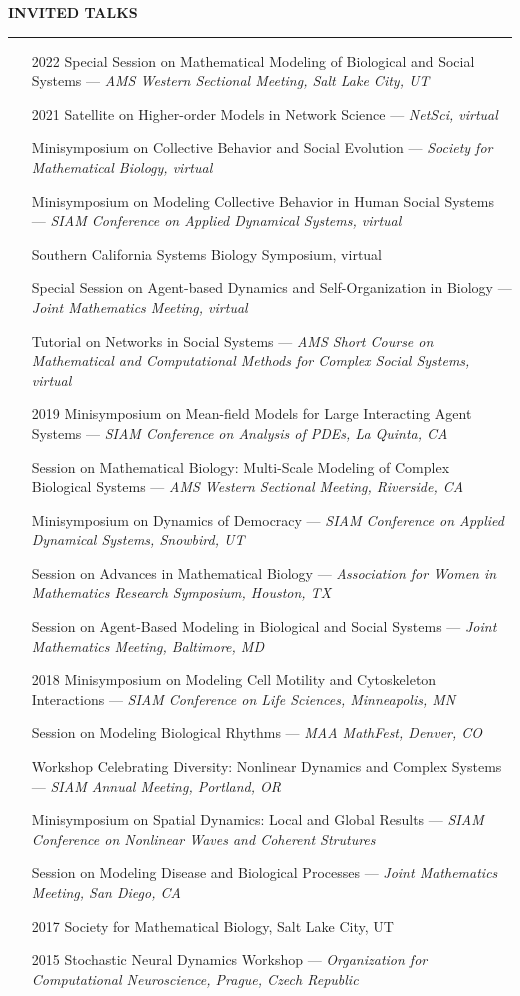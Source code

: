 \documentclass{resume} %
\renewenvironment{rSection}[1]{
\sectionskip
\textcolor{WinePurple}{\MakeUppercase{#1}}
\sectionlineskip
\hrule
\begin{list}{}{
\setlength{\leftmargin}{1.5em}
}
\item[]
}{
\end{list}
}
\begin{document}
\begin{rSection}{\bf Invited Talks}
\begin{itemize}
    {\em Joint Mathematics Meeting, Boston, MA}
    \item[2022] Special Session on Mathematical Modeling of Biological and Social Systems ---
    {\em AMS Western Sectional Meeting, Salt Lake City, UT}
    \item[2021] Satellite on Higher-order Models in Network Science --- {\em NetSci, virtual}
    \item[] Minisymposium on Collective Behavior and Social Evolution --- {\em Society for Mathematical Biology, virtual}
    \item[] Minisymposium on Modeling Collective Behavior in Human Social Systems --- {\em SIAM Conference on Applied Dynamical Systems, virtual}
    \item[] Southern California Systems Biology Symposium, virtual
    \item[] Special Session on Agent-based Dynamics and Self-Organization in Biology ---
    {\em Joint Mathematics Meeting, virtual}
    \item[] Tutorial on Networks in Social Systems ---
    {\em AMS Short Course on Mathematical and Computational Methods for Complex Social Systems, virtual}
    \item[2019] Minisymposium on Mean-field Models for Large Interacting Agent Systems ---
    {\em SIAM Conference on Analysis of PDEs, La Quinta, CA}
    \item[] Session on Mathematical Biology: Multi-Scale Modeling of Complex Biological Systems ---
    {\em AMS Western Sectional Meeting, Riverside, CA}
    \item[] Minisymposium on Dynamics of Democracy ---
    {\em SIAM Conference on Applied Dynamical Systems, Snowbird, UT}
    \item[] Session on Advances in Mathematical Biology ---
    {\em Association for Women in Mathematics Research Symposium, Houston, TX}
    \item[] Session on Agent-Based Modeling in Biological and Social Systems ---
    {\em Joint Mathematics Meeting, Baltimore, MD}
    \item[2018] Minisymposium on Modeling Cell Motility and Cytoskeleton Interactions ---
    {\em SIAM Conference on Life Sciences, Minneapolis, MN}
    \item[] Session on Modeling Biological Rhythms ---
    {\em MAA MathFest, Denver, CO}
    \item[] Workshop Celebrating Diversity: Nonlinear Dynamics and Complex Systems ---
    {\em SIAM Annual Meeting, Portland, OR}
    \item[] Minisymposium on Spatial Dynamics: Local and Global Results ---
    {\em SIAM Conference on Nonlinear Waves and Coherent Strutures}
    \item[] Session on Modeling Disease and Biological Processes ---
    {\em Joint Mathematics Meeting, San Diego, CA}
    \item[2017] Society for Mathematical Biology, Salt Lake City, UT
    \item[2015] Stochastic Neural Dynamics Workshop ---
    {\em Organization for Computational Neuroscience, Prague, Czech Republic}
\end{itemize}


\end{rSection}
\end{document}
